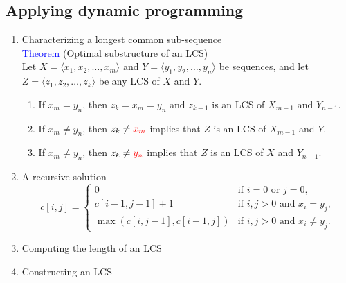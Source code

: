 \documentclass[a4paper]{article}
\begin{document}
\subsection*{Applying dynamic programming}
\begin{enumerate}
    \item Characterizing a longest common sub-sequence\\
        \textcolor{blue}{Theorem} (Optimal substructure of an LCS)\\
        Let $X=\langle x_1,x_2,\ldots, x_m\rangle$ and $Y=\langle y_1,y_2,\ldots, y_n\rangle$ be sequences, and let $Z=\langle z_1,z_2,\ldots, z_k\rangle$ be any LCS of $X$ and $Y$.
        \begin{enumerate}
            \item If $x_m=y_n$, then $z_k=x_m=y_n$ and $z_{k-1}$ is an LCS of $X_{m-1}$ and $Y_{n-1}$.
            \item If $x_m\neq y_n$, then $z_k\neq \textcolor{red}{x_m}$ implies that $Z$ is an LCS of $X_{m-1}$ and $Y$.
            \item If $x_m\neq y_n$, then $z_k\neq \textcolor{red}{y_n}$ implies that $Z$ is an LCS of $X$ and $Y_{n-1}$.
        \end{enumerate}
    \item A recursive solution
        \begin{equation*}
            c[i,j] =
            \begin{cases}
            0  & \text{if $i=0$ or $j=0$,} \\
            c[i-1,j-1]+1 & \text{if $i,j>0$ and $x_i=y_j$},\\
            \max{(c[i,j-1],c[i-1,j])} & \text{if $i,j>0$ and $x_i\neq y_j$}.
            \end{cases}    
        \end{equation*}
    \item Computing the length of an LCS
    \item Constructing an LCS
\end{enumerate}
\end{document}
